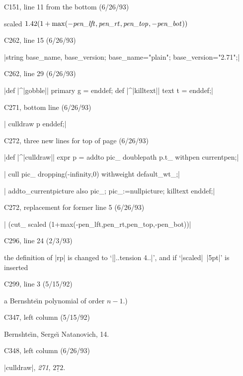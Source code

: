 \hsize=29pc
\def\\#1{\hbox{\it#1\/\kern.05em}} %

\bugonpage C151, line 11 from the bottom (6/26/93)

\ninepoint\indent
\qquad   scaled $1.42(1+\max(-\\{pen\_lft},\\{pen\_rt},\\{pen\_top},
  -\\{pen\_bot}))$

\bugonpage C262, line 15 (6/26/93)

\ninepoint\noindent
|string base_name, base_version; base_name="plain"; base_version="2.71";|

\bugonpage C262, line 29 (6/26/93)

\ninepoint\noindent
|def |^|gobble|| primary g = enddef; def |^|killtext|| text t = enddef;|

\bugonpage C271, bottom line (6/26/93)

\ninepoint\noindent
| culldraw p enddef;|

\bugonpage C272, three new lines for top of page (6/26/93)

{\ninepoint\parindent=0pt
|def |^|culldraw|| expr p = addto pic_ doublepath p.t_ withpen currentpen;|\par
| cull pic_ dropping(-infinity,0) withweight default_wt_;|\par
| addto_currentpicture also pic_; pic_:=nullpicture; killtext enddef;|\par
}

\bugonpage C272, replacement for former line 5 (6/26/93)

\ninepoint\noindent
|  (cut_ scaled (1+max(-pen_lft,pen_rt,pen_top,-pen_bot))|

\bugonpage C296, line 24 (2/3/93)

\ninepoint\noindent
the definition of |rp| is changed to `|]..tension 4..|',
and if `|scaled|~|5pt|' is inserted\cutpar

\bugonpage C299, line 3 (5/15/92)

\ninepoint\noindent
a Bernshte{\u\i}n polynomial of order $n-1$.)

\bugonpage C347, left column (5/15/92)

\eightpoint
Bernshte{\u\i}n, Serge{\u\i} \thinspace Natanovich, 14.

\bugonpage C348, left column (6/26/93)

\eightpoint
|culldraw|, {\it271}, $\underline{272}$.

